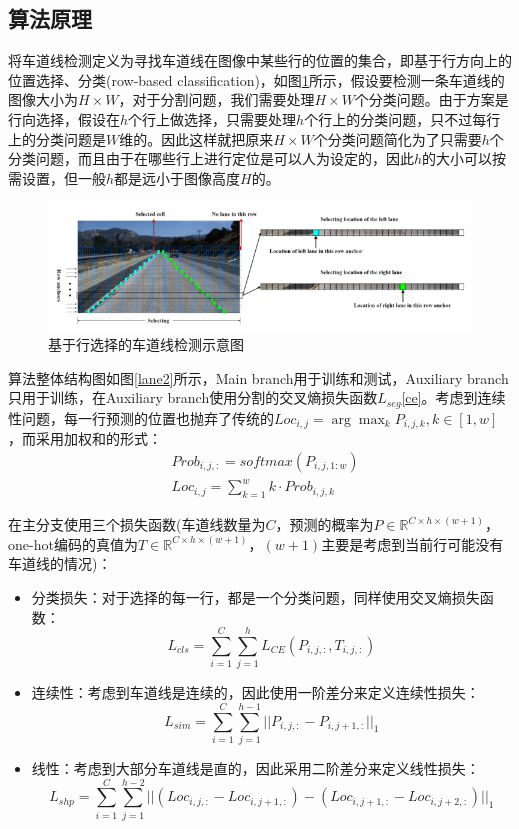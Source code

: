 \documentclass[cn,12pt,color=mine,scheme=chinese,bibstyle=gb7714-2015]{elegantbook}
\begin{document}
\subsection{算法原理}
将车道线检测定义为寻找车道线在图像中某些行的位置的集合，即基于行方向上的位置选择、分类(row-based classification)，如图\ref{lane1}所示，假设要检测一条车道线的图像大小为$H\times W$，对于分割问题，我们需要处理$H\times W$个分类问题。由于方案是行向选择，假设在$h$个行上做选择，只需要处理$h$个行上的分类问题，只不过每行上的分类问题是$W$维的。因此这样就把原来$H\times W$个分类问题简化为了只需要$h$个分类问题，而且由于在哪些行上进行定位是可以人为设定的，因此$h$的大小可以按需设置，但一般$h$都是远小于图像高度$H$的。

\begin{figure}[h]
	\centering
	\includegraphics[width=.95\linewidth]{images/lane1}
	\caption{基于行选择的车道线检测示意图}
	\label{lane1}
\end{figure}

算法整体结构图如图\ref{lane2}所示，Main branch用于训练和测试，Auxiliary branch只用于训练，在Auxiliary branch使用分割的交叉熵损失函数$L_{seg}$\eqref{ce}。考虑到连续性问题，每一行预测的位置也抛弃了传统的$Loc_{i,j}=\arg\max_k P_{i,j,k},k\in[1,w]$，而采用加权和的形式：
\begin{equation}
	\begin{aligned}
		&Prob_{i,j,:}=softmax(P_{i,j,1:w}) \\
		&Loc_{i,j}=\sum_{k=1}^wk\cdot Prob_{i,j,k}
	\end{aligned}
\end{equation}

在主分支使用三个损失函数(车道线数量为$C$，预测的概率为$P\in\mathbb{R}^{C\times h\times (w+1)}$，one-hot编码的真值为$T\in\mathbb{R}^{C\times h\times (w+1)}$，$(w+1)$主要是考虑到当前行可能没有车道线的情况)：

\begin{itemize}
	\item 分类损失：对于选择的每一行，都是一个分类问题，同样使用交叉熵损失函数：
	\begin{equation}
		L_{cls}=\sum_{i=1}^{C}\sum_{j=1}^hL_{CE}(P_{i,j,:},T_{i,j,:})
	\end{equation}
	\item 连续性：考虑到车道线是连续的，因此使用一阶差分来定义连续性损失：
	\begin{equation}
		L_{sim}=\sum_{i=1}^{C}\sum_{j=1}^{h-1}||P_{i,j,:}-P_{i,j+1,:}||_1
	\end{equation}
	\item 线性：考虑到大部分车道线是直的，因此采用二阶差分来定义线性损失：
	\begin{equation}
		L_{shp}=\sum_{i=1}^{C}\sum_{j=1}^{h-2}||(Loc_{i,j,:}-Loc_{i,j+1,:})-(Loc_{i,j+1,:}-Loc_{i,j+2,:})||_1
	\end{equation}
\end{itemize}
\end{document}
